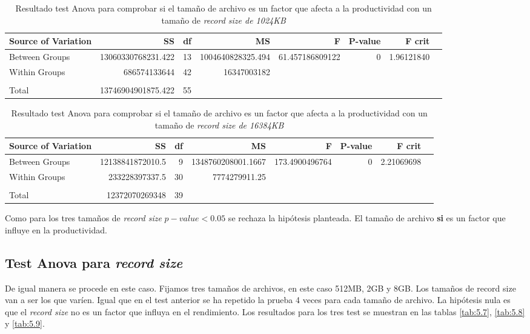 \begin{table}[H]\centering
\scriptsize
\begin{tabular}{lrrrrrrr}\toprule
Source of Variation &SS &df &MS &F &P-value &F crit \\\midrule
Between Groups &13060330768231.422 &13 &1004640828325.494 &61.457186809122 &0 &1.96121840 \\
Within Groups &686574133644 &42 &16347003182 & & & \\
& & & & & & \\
Total &13746904901875.422 &55 & & & & \\
\bottomrule
\end{tabular}
\caption{Resultado test Anova para comprobar si el tamaño de archivo es un factor que afecta a la productividad con un tamaño de \textit{record size de 1024KB}}\label{tab: }
\end{table}

\begin{table}[H]\centering
\scriptsize
\begin{tabular}{lrrrrrrr}\toprule
Source of Variation &SS &df &MS &F &P-value &F crit \\\midrule
Between Groups &12138841872010.5 &9 &1348760208001.1667 &173.4900496764 &0 &2.21069698 \\
Within Groups &233228397337.5 &30 &7774279911.25 & & & \\
& & & & & & \\
Total &12372070269348 &39 & & & & \\
\bottomrule
\end{tabular}
\caption{Resultado test Anova para comprobar si el tamaño de archivo es un factor que afecta a la productividad con un tamaño de \textit{record size de 16384KB}}\label{tab: }
\end{table}

Como para los tres tamaños de \textit{record size} $p-value < 0.05$ se rechaza la hipótesis planteada. El tamaño de archivo \textbf{si} es un factor que influye en la productividad.

\subsection{Test Anova para \textit{record size}}
De igual manera se procede en este caso. Fijamos tres tamaños de archivos, en este caso 512MB, 2GB y 8GB. Los tamaños de record size van a ser los que varíen. Igual que en el test anterior se ha repetido la prueba 4 veces para cada tamaño de archivo. La hipótesis nula es que el \textit{record size} no es un factor que influya en el rendimiento. Los resultados para los tres test se muestran en las tablas \ref{tab:5.7}, \ref{tab:5.8} y \ref{tab:5.9}.

